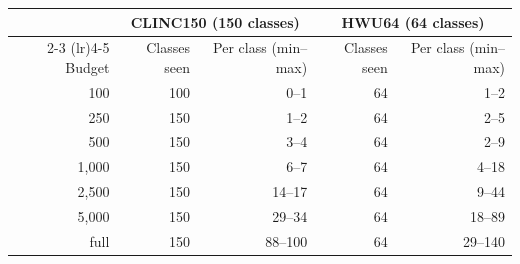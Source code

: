 \begin{tabular}{rrrrr}
\toprule
 & \multicolumn{2}{c}{CLINC150 (150 classes)} & \multicolumn{2}{c}{HWU64 (64 classes)} \\
\cmidrule(lr){2-3} \cmidrule(lr){4-5}
Budget & Classes seen & Per class (min--max) & Classes seen & Per class (min--max) \\
\midrule
100 & 100 & 0--1 & 64 & 1--2 \\
250 & 150 & 1--2 & 64 & 2--5 \\
500 & 150 & 3--4 & 64 & 2--9 \\
1{,}000 & 150 & 6--7 & 64 & 4--18 \\
2{,}500 & 150 & 14--17 & 64 & 9--44 \\
5{,}000 & 150 & 29--34 & 64 & 18--89 \\
full & 150 & 88--100 & 64 & 29--140 \\
\bottomrule
\end{tabular}
